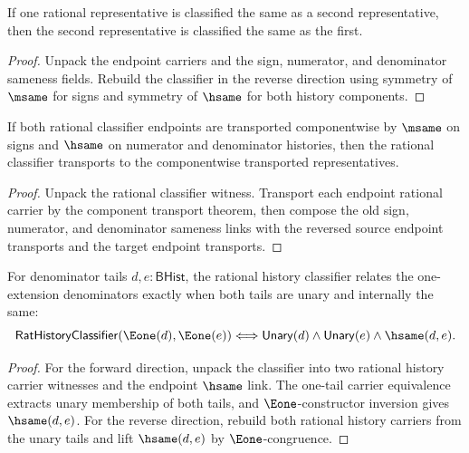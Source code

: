 \begin{theorem}
\label{thm:rat-classifier-symmetry}
If one rational representative is classified the same as a second representative,
then the second representative is classified the same as the first.
\end{theorem}
\begin{proof}
Unpack the endpoint carriers and the sign, numerator, and denominator sameness
fields. Rebuild the classifier in the reverse direction using symmetry of
\(\msame\) for signs and symmetry of \(\hsame\) for both history components.
\end{proof}

\begin{theorem}
\label{thm:rat-classifier-component-transport}
If both rational classifier endpoints are transported componentwise by
\(\msame\) on signs and \(\hsame\) on numerator and denominator histories,
then the rational classifier transports to the componentwise transported
representatives.
\end{theorem}
\begin{proof}
Unpack the rational classifier witness. Transport each endpoint rational
carrier by the component transport theorem, then compose the old sign,
numerator, and denominator sameness links with the reversed source endpoint
transports and the target endpoint transports.
\end{proof}

\begin{theorem}
\label{thm:rat-history-classifier-e1-tail-unary-iff}
For denominator tails \(d,e:\mathsf{BHist}\), the rational history classifier
relates the one-extension denominators exactly when both tails are unary and
internally the same:
$$
\mathsf{RatHistoryClassifier}(\Eone(d),\Eone(e))
\Longleftrightarrow
\mathsf{Unary}(d)\land \mathsf{Unary}(e)\land \hsame(d,e).
$$
\end{theorem}
\begin{proof}
For the forward direction, unpack the classifier into two rational history
carrier witnesses and the endpoint \(\hsame\) link. The one-tail carrier
equivalence extracts unary membership of both tails, and \(\Eone\)-constructor
inversion gives \(\hsame(d,e)\). For the reverse direction, rebuild both
rational history carriers from the unary tails and lift \(\hsame(d,e)\) by
\(\Eone\)-congruence.
\end{proof}

